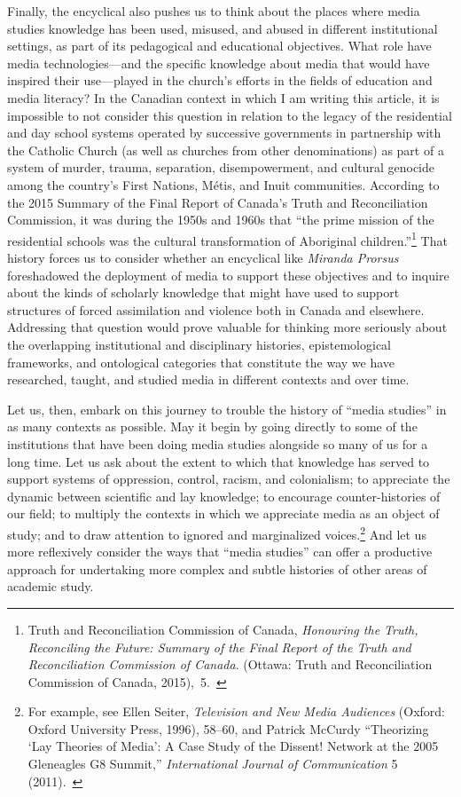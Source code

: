 \documentclass{tufte-handout}
\begin{document}
Finally, the encyclical also pushes us to think about the places where
media studies knowledge has been used, misused, and abused in different
institutional settings, as part of its pedagogical and educational
objectives. What role have media technologies---and the specific
knowledge about media that would have inspired their use---played in the
church's efforts in the fields of education and media literacy? In the
Canadian context in which I am writing this article, it is impossible to
not consider this question in relation to the legacy of the residential
and day school systems operated by successive governments in partnership
with the Catholic Church (as well as churches from other denominations)
as part of a system of murder, trauma, separation, disempowerment, and
cultural genocide among the country's First Nations, Métis, and Inuit
communities. According to the 2015 Summary of the Final Report of
Canada's Truth and Reconciliation Commission, it was during the 1950s
and 1960s that ``the prime mission of the residential schools was the
cultural transformation of Aboriginal children.''\footnote{Truth and
  Reconciliation Commission of Canada, \emph{Honouring the Truth,
  Reconciling the Future: Summary of the Final Report of the Truth and
  Reconciliation Commission of Canada}. (Ottawa: Truth and
  Reconciliation Commission of Canada, 2015),~5.~} That history forces
us to consider whether an encyclical like \emph{Miranda Prorsus}
foreshadowed the deployment of media to support these objectives and to
inquire about the kinds of scholarly knowledge that might have used to
support structures of forced assimilation and violence both in Canada
and elsewhere. Addressing that question would prove valuable for
thinking more seriously about the overlapping institutional and
disciplinary histories, epistemological frameworks, and ontological
categories that constitute the way we have researched, taught, and
studied media in different contexts and over time.

Let us, then, embark on this journey to trouble the history of ``media
studies'' in as many contexts as possible. May it begin by going
directly to some of the institutions that have been doing media studies
alongside so many of us for a long time. Let us ask about the extent to
which that knowledge has served to support systems of oppression,
control, racism, and colonialism; to appreciate the dynamic between
scientific and lay knowledge; to encourage counter-histories of our
field; to multiply the contexts in which we appreciate media as an
object of study; and to draw attention to ignored and marginalized
voices.\footnote{For example, see Ellen Seiter, \emph{Television and New
  Media Audiences} (Oxford: Oxford University Press, 1996), 58­--60, and
  Patrick McCurdy ``Theorizing `Lay Theories of Media': A Case Study of
  the Dissent! Network at the 2005 Gleneagles G8 Summit,''
  \emph{International Journal of Communication} 5 (2011).~} And let us
more reflexively consider the ways that ``media studies'' can offer a
productive approach for undertaking more complex and subtle histories of
other areas of academic study.
\end{document}
